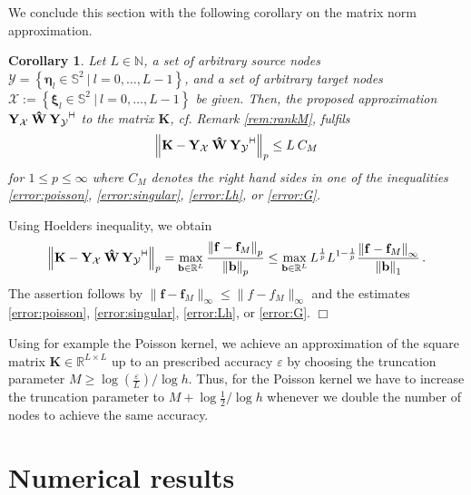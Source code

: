 \documentclass[11pt,a4paper,twoside,bibtotoc]{scrartcl}
\theoremstyle{plain}
\newtheorem{corollary}[theorem]{Corollary}
\theoremstyle{definition}
\theoremstyle{remark}
\newenvironment{proof}{{\bf Proof.}}{$\Box$}
\newcommand{\adj}{{\vdash \hspace*{-1.72mm} \dashv}}
\newcommand{\N}{\ensuremath{\mathbb{N}}}
\newcommand{\R}{\ensuremath{\mathbb{R}}}
\newcommand{\pset}[3]{\ensuremath{\left\{#1\ \left#2\ #3\right.\right\rbrace}}
\newcommand{\twosphere}{\ensuremath{\mathbb{S}^2}}
\newcommand{\mb}[1]{\mathbf{#1}}
\newcommand{\V}[1]{\mb{#1}}
\numberwithin{equation}{section}
\numberwithin{table}{section}
\numberwithin{figure}{section}
\begin{document}
We conclude this section with the following corollary on the matrix norm
approximation.
\begin{corollary}
  \label{cor:rankapprox}
  Let $L \in \N$, a set of arbitrary source nodes $\mathcal{Y} =
  \pset{\V{\eta}_{l} \in \twosphere}{|}{l = 0,\ldots,L-1}$, and a set of
  arbitrary target nodes $\mathcal{X} := \pset{\V{\xi}_{l} \in
  \twosphere}{|}{l=0,\ldots,L-1}$ be given.
  Then, the proposed approximation $\V{Y_{\mathcal{X}}} \: \V{\hat W} \:
  \V{Y_{\mathcal{Y}}}^{\adj}$ to the matrix $\V{K}$, cf. Remark
  \ref{rem:rankM}, fulfils
  \begin{equation*}
    \left\| \V{K} - \V{Y_{\mathcal{X}}} \: \V{\hat W} \:
      \V{Y_{\mathcal{Y}}}^{\adj} \right\|_p
    \le L \: C_M
  \end{equation*}
  for $1\le p \le \infty$ where $C_M$ denotes the right hand sides in one of
  the inequalities \eqref{error:poisson}, \eqref{error:singular},
  \eqref{error:Lh}, or \eqref{error:G}. 
\end{corollary}
\begin{proof}
 Using Hoelders inequality, we obtain
 \[
 \left\| \V{K} - \V{Y_{\mathcal{X}}} \: \V{\hat W} \:
   \V{Y_{\mathcal{Y}}}^{\adj} \right\|_p
 = \max_{\V{b}\in \R^L} \frac{\left\|\V{f} -
     \V{f}_{M}\right\|_{p}}{\left\|\V{b}\right\|_p}
 \le \max_{\V{b}\in \R^L} L^{\frac{1}{p}} L^{1-\frac{1}{p}} \frac{\left\|\V{f}
     - \V{f}_{M}\right\|_{\infty}}{\left\|\V{b}\right\|_1}\,.
 \]
 The assertion follows by $\|\V{f} - \V{f}_{M}\|_{\infty} \le
  \|f-f_M\|_{\infty}$ and the estimates
  \eqref{error:poisson}, \eqref{error:singular}, \eqref{error:Lh}, or
  \eqref{error:G}.
\end{proof}

Using for example the Poisson kernel, we achieve an approximation of the square matrix
$\V{K}\in\R^{L \times L}$ up to an prescribed accuracy $\varepsilon$ by
choosing the truncation parameter $M\ge \log(\frac{\varepsilon}{L}) /\log h$.
Thus, for the Poisson kernel we have to increase the truncation parameter to
$M+\log\frac{1}{2} / \log h$ whenever we double the number of nodes to achieve
the same accuracy.

\section{Numerical results}
\end{document}
